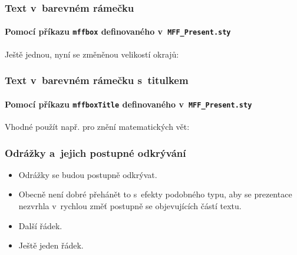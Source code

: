 \documentclass[c, 10pt]{beamer}
\begin{document}
\begin{frame}\frametitle{Text v~barevném rámečku}
\framesubtitle{Pomocí příkazu \texttt{mffbox} definovaného v~\texttt{MFF\_{}Present.sty}}


\vspace{2em}
Ještě jednou, nyní se změněnou velikostí okrajů:

\end{frame}

\begin{frame}\frametitle{Text v~barevném rámečku s~titulkem}
\framesubtitle{Pomocí příkazu \texttt{mffboxTitle} definovaného v~\texttt{MFF\_{}Present.sty}}


\vspace{2em}
Vhodné použít např. pro znění matematických vět:

\end{frame}

\begin{frame}\frametitle{Odrážky a~jejich postupné odkrývání}

\begin{itemize}[<+->]\itemsep=1em
\item Odrážky se budou postupně odkrývat.
\item Obecně není dobré přehánět to s~efekty podobného typu, aby se prezentace nezvrhla
  v~rychlou změť postupně se objevujících částí textu.
\item Další řádek.
\item Ještě jeden řádek.
\end{itemize}

\end{frame}
\end{document}
